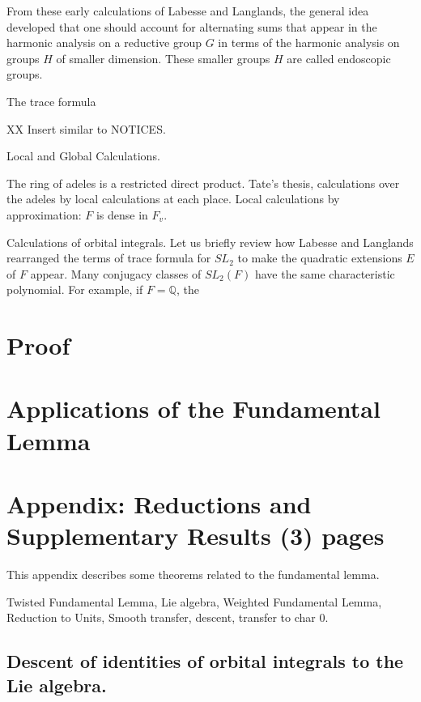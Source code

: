 \documentclass[brochure,english,12pt]{bourbaki}
\newcommand{\ring}[1]{\mathbb{#1}}
\begin{document}
From these early
calculations of Labesse and Langlands, the general idea  developed that one should account for
alternating sums that appear in the
harmonic analysis on a reductive group $G$ in terms of the harmonic analysis on groups $H$ of smaller dimension.  
These smaller groups $H$ are called endoscopic groups.  

The trace formula

XX Insert similar to NOTICES.

Local and Global Calculations.

The ring of adeles is a restricted direct product.  Tate's thesis,
calculations over the adeles by local calculations at each place.
Local calculations by approximation: $F$ is dense in $F_v$.


Calculations of orbital integrals.  Let us briefly review how Labesse and Langlands rearranged the terms of trace formula for $SL_2$ to make the quadratic extensions $E$ of $F$ appear.  Many conjugacy classes of $SL_2(F)$ have the same characteristic polynomial.  For example, if $F=\ring{Q}$,
the 

\section{Proof} %

\section{Applications of the Fundamental Lemma}  




\section{Appendix: Reductions and Supplementary Results (3) pages}



This appendix describes some theorems related to the fundamental lemma.

Twisted Fundamental Lemma, Lie algebra, Weighted Fundamental Lemma, Reduction to Units, Smooth transfer, descent, transfer to char 0.

\subsection{Descent of identities of orbital integrals to the Lie algebra.}
\end{document}
